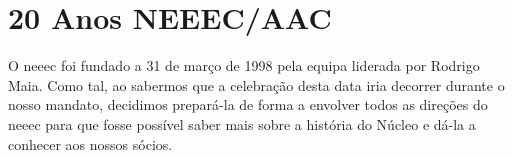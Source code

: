 
\section{20 Anos NEEEC/AAC}

O \acrshort{neeec} foi fundado a 31 de março de 1998 pela equipa liderada por Rodrigo Maia. Como tal, ao sabermos que a celebração desta data iria decorrer durante o nosso mandato, decidimos prepará-la de forma a envolver todos as direções do \acrshort{neeec} para que fosse possível saber mais sobre a história do Núcleo e dá-la a conhecer aos nossos sócios.








